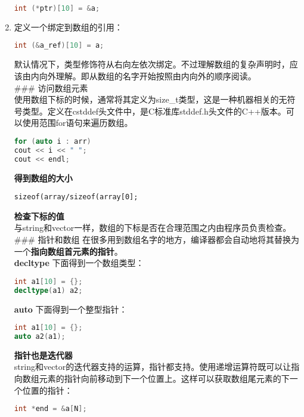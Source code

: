 \documentclass[
  a4paper,
  oneside,tablecaptionabove
]{scrbook}
\begin{document}
\begin{enumerate}
\begin{lstlisting}[language={C++}]
int (*ptr)[10] = &a;
\end{lstlisting}
\item
  定义一个绑定到数组的引用：

\begin{lstlisting}[language={C++}]
int (&a_ref)[10] = a;
\end{lstlisting}

  默认情况下，类型修饰符从右向左依次绑定。不过理解数组的复杂声明时，应该由内向外理解。即从数组的名字开始按照由内向外的顺序阅读。\\
  \#\#\# 访问数组元素\\
  使用数组下标的时候，通常将其定义为size\_t类型，这是一种机器相关的无符号类型。定义在cstddef头文件中，是C标准库stddef.h头文件的C++版本。可以使用范围for语句来遍历数组。

\begin{lstlisting}[language={C++}]
for (auto i : arr)
cout << i << " ";
cout << endl;
\end{lstlisting}

  \textbf{得到数组的大小}

\begin{lstlisting}
sizeof(array/sizeof(array[0];
\end{lstlisting}

  \textbf{检查下标的值}\\
  与string和vector一样，数组的下标是否在合理范围之内由程序员负责检查。\\
  \#\#\# 指针和数组
  在很多用到数组名字的地方，编译器都会自动地将其替换为一个\textbf{指向数组首元素的指针}。\\
  \textbf{decltype} 下面得到一个数组类型：

\begin{lstlisting}[language={C++}]
int a1[10] = {};
decltype(a1) a2;
\end{lstlisting}

  \textbf{auto} 下面得到一个整型指针：

\begin{lstlisting}[language={C++}]
int a1[10] = {};
auto a2(a1);
\end{lstlisting}

  \textbf{指针也是迭代器}\\
  string和vector的迭代器支持的运算，指针都支持。使用递增运算符既可以让指向数组元素的指针向前移动到下一个位置上。这样可以获取数组尾元素的下一个位置的指针：

\begin{lstlisting}[language={C++}]
int *end = &a[N];
\end{lstlisting}


\end{enumerate}
\end{document}

